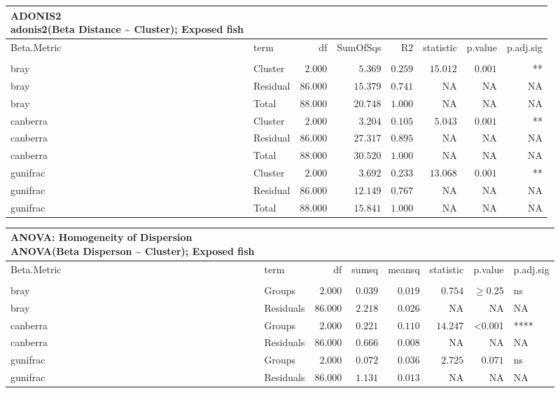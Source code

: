\documentclass[
]{article}
\begin{document}
\begin{longtable}{llrrrrrr}
\caption*{
{\large ADONIS2} \\ 
{\small adonis2(Beta Distance \textasciitilde{} Cluster); Exposed fish}
} \\ 
\toprule
Beta.Metric & term & df & SumOfSqs & R2 & statistic & p.value & p.adj.sig \\ 
\midrule\addlinespace[2.5pt]
\multicolumn{8}{l}{Phylogenetic} \\ 
\midrule\addlinespace[2.5pt]
bray & Cluster & $2.000$ & $5.369$ & $0.259$ & $15.012$ & $0.001$ & ** \\ 
bray & Residual & $86.000$ & $15.379$ & $0.741$ & NA & NA & NA \\ 
bray & Total & $88.000$ & $20.748$ & $1.000$ & NA & NA & NA \\ 
canberra & Cluster & $2.000$ & $3.204$ & $0.105$ & $5.043$ & $0.001$ & ** \\ 
canberra & Residual & $86.000$ & $27.317$ & $0.895$ & NA & NA & NA \\ 
canberra & Total & $88.000$ & $30.520$ & $1.000$ & NA & NA & NA \\ 
gunifrac & Cluster & $2.000$ & $3.692$ & $0.233$ & $13.068$ & $0.001$ & ** \\ 
gunifrac & Residual & $86.000$ & $12.149$ & $0.767$ & NA & NA & NA \\ 
gunifrac & Total & $88.000$ & $15.841$ & $1.000$ & NA & NA & NA \\ 
\bottomrule
\end{longtable}
\begin{longtable}{llrrrrrl}
\caption*{
{\large ANOVA: Homogeneity of Dispersion} \\ 
{\small ANOVA(Beta Disperson \textasciitilde{} Cluster); Exposed fish}
} \\ 
\toprule
Beta.Metric & term & df & sumsq & meansq & statistic & p.value & p.adj.sig \\ 
\midrule\addlinespace[2.5pt]
\multicolumn{8}{l}{Phylogenetic} \\ 
\midrule\addlinespace[2.5pt]
bray & Groups & $2.000$ & $0.039$ & $0.019$ & $0.754$ & $\geq$0.25 & ns \\ 
bray & Residuals & $86.000$ & $2.218$ & $0.026$ & NA & NA & NA \\ 
canberra & Groups & $2.000$ & $0.221$ & $0.110$ & $14.247$ & <0.001 & **** \\ 
canberra & Residuals & $86.000$ & $0.666$ & $0.008$ & NA & NA & NA \\ 
gunifrac & Groups & $2.000$ & $0.072$ & $0.036$ & $2.725$ & $0.071$ & ns \\ 
gunifrac & Residuals & $86.000$ & $1.131$ & $0.013$ & NA & NA & NA \\ 
\bottomrule
\end{longtable}
\end{document}
